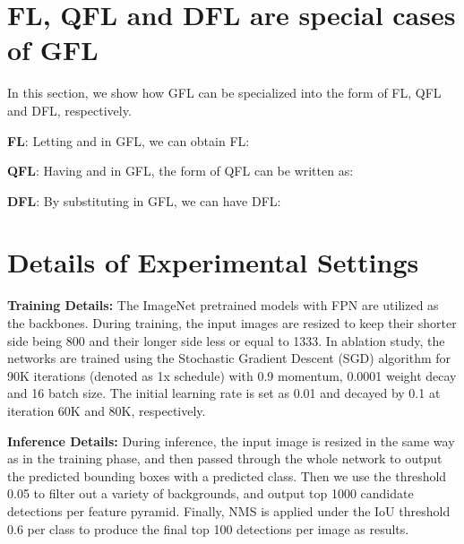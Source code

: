 \documentclass{article}
\begin{document}
\section{FL, QFL and DFL are special cases of GFL}
In this section, we show how GFL can be specialized into the form of FL, QFL and DFL, respectively.

\textbf{FL}: Letting  and  in GFL, we can obtain FL:


\textbf{QFL}: Having  and  in GFL, the form of QFL can be written as:


\textbf{DFL}: By substituting  in GFL, we can have DFL:








\section{Details of Experimental Settings}
\textbf{Training Details:} The ImageNet pretrained
models \cite{he2016deep} with FPN \cite{lin2017feature} are utilized as the backbones. During training, the input images are resized to keep their shorter side being 800 and their longer side less or equal to 1333. In ablation study, the networks are trained using the Stochastic Gradient Descent (SGD) algorithm for 90K iterations (denoted as 1x schedule) with 0.9 momentum, 0.0001 weight decay and 16 batch size. The initial learning rate is set as 0.01 and decayed by 0.1 at iteration 60K and 80K, respectively.  


\textbf{Inference Details:} During inference, the input image is resized in the same way as in the training phase, and then passed through the whole network to output the predicted bounding boxes with a predicted class. Then we use the threshold 0.05 to filter out a variety of backgrounds, and output top 1000 candidate detections per feature pyramid. Finally, NMS is applied under the IoU threshold 0.6 per class to produce the final top 100 detections per image as results.
\end{document}
